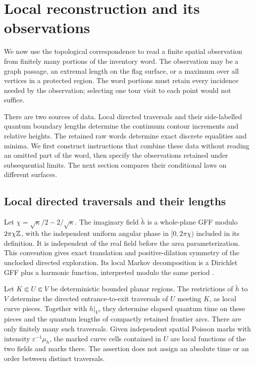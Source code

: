 \section{Local reconstruction and its observations}\label{local:section}

We now use the topological correspondence to read a finite spatial
observation from finitely many portions of the inventory word.  The
observation may be a graph passage, an extremal length on the flag
surface, or a maximum over all vertices in a protected region.  The
word portions must retain every incidence needed by the observation;
selecting one tour visit to each point would not suffice.

There are two sources of data.  Local directed traversals and their
side-labelled quantum boundary lengths determine the continuum contour
increments and relative heights.  The retained raw words determine
exact discrete equalities and minima.  We first construct instructions
that combine these data without reading an omitted part of the word,
then specify the observations retained under subsequential limits.
The next section compares their conditional laws on different surfaces.

\subsection{Local directed traversals and their lengths}

Let $\chi=\sqrt\kappa/2-2/\sqrt\kappa$.
The imaginary field $\widetilde h$ is a whole-plane GFF modulo
$2\pi\chi\mathbb Z$, with the independent uniform angular phase in
$[0,2\pi\chi)$ included in its definition.  It is independent of the real
field before the area parameterization.  This convention gives exact
translation and positive-dilation symmetry of the unclocked directed
exploration.  Its local Markov decomposition is a Dirichlet GFF plus a
harmonic function, interpreted modulo the same period
\cite[Section 2.2.1 and Propositions 2.8, 2.11]{MillerSheffieldIGIV}.

\begin{lemma}\label{enc:local-exploration}
Let $K\Subset U\Subset V$ be deterministic bounded planar regions.
The restrictions of $\widetilde h$ to $V$ determine the directed
entrance-to-exit traversals of $U$ meeting $K$, as local curve pieces.
Together with $h|_V$, they determine elapsed quantum time on these
pieces and the quantum lengths of compactly retained frontier arcs.
There are only finitely many such traversals.  Given independent spatial
Poisson marks with intensity $\varepsilon^{-1}\mu_h$, the marked curve
cells contained in $U$ are local functions of the two fields and marks
there.  The assertion does not assign an absolute time or an order between
distinct traversals.
\end{lemma}

